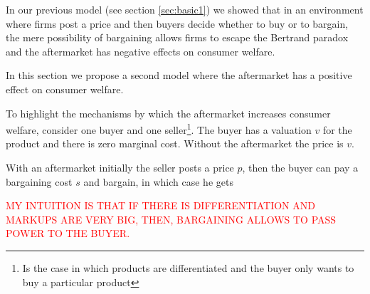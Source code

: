 \documentclass[12pt]{article}
\theoremstyle{plain}
\theoremstyle{plain}
\begin{document}
In our previous model (see section \ref{sec:basic1}) we showed that in an environment where firms post a price and then buyers decide whether to buy or to bargain, the mere possibility of bargaining allows firms to escape the Bertrand paradox and the aftermarket has negative effects on consumer welfare. 

In this section we propose a second model where the aftermarket has a positive effect on consumer welfare. 

To highlight the mechanisms by which the aftermarket increases consumer welfare, consider one buyer and one seller\footnote{Is the case in which products are differentiated and the buyer only wants to buy a particular product}. The buyer has a valuation $v$ for the product and there is zero marginal cost. Without the aftermarket the price is $v$. 

With an aftermarket initially the seller posts a price $p$, then the buyer can pay a bargaining cost $s$ and bargain, in which case he gets 

\textcolor{red}{MY INTUITION IS THAT IF THERE IS DIFFERENTIATION AND MARKUPS ARE VERY BIG, THEN, BARGAINING ALLOWS TO PASS POWER TO THE BUYER. }
\end{document}

